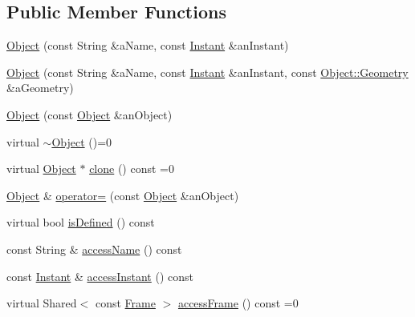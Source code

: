 \subsection*{Public Member Functions}
\begin{DoxyCompactItemize}
\item 
\hyperlink{classostk_1_1physics_1_1env_1_1_object_acd023212c67c893a753f1f3e2cf5c745}{Object} (const String \&a\+Name, const \hyperlink{classostk_1_1physics_1_1time_1_1_instant}{Instant} \&an\+Instant)
\item 
\hyperlink{classostk_1_1physics_1_1env_1_1_object_a8b314016640cee6729de6ae6364ba51f}{Object} (const String \&a\+Name, const \hyperlink{classostk_1_1physics_1_1time_1_1_instant}{Instant} \&an\+Instant, const \hyperlink{classostk_1_1physics_1_1env_1_1_object_a66e44a65aefb23a184a6de531e96935d}{Object\+::\+Geometry} \&a\+Geometry)
\item 
\hyperlink{classostk_1_1physics_1_1env_1_1_object_abddb73324d38f53b395ebee283e78ce1}{Object} (const \hyperlink{classostk_1_1physics_1_1env_1_1_object}{Object} \&an\+Object)
\item 
virtual \hyperlink{classostk_1_1physics_1_1env_1_1_object_a317cd99f9e64b168ca28a7e1dbcf1cbc}{$\sim$\+Object} ()=0
\item 
virtual \hyperlink{classostk_1_1physics_1_1env_1_1_object}{Object} $\ast$ \hyperlink{classostk_1_1physics_1_1env_1_1_object_a8e45ece3cf6d7be05a984a8857b7ecd3}{clone} () const =0
\item 
\hyperlink{classostk_1_1physics_1_1env_1_1_object}{Object} \& \hyperlink{classostk_1_1physics_1_1env_1_1_object_aebe1f6eca2d149968f496577fd291296}{operator=} (const \hyperlink{classostk_1_1physics_1_1env_1_1_object}{Object} \&an\+Object)
\item 
virtual bool \hyperlink{classostk_1_1physics_1_1env_1_1_object_aaa5131bafbaf86fde7f649e88343a901}{is\+Defined} () const
\item 
const String \& \hyperlink{classostk_1_1physics_1_1env_1_1_object_aea899eb9d809f8b344127ceb5c1056c4}{access\+Name} () const
\item 
const \hyperlink{classostk_1_1physics_1_1time_1_1_instant}{Instant} \& \hyperlink{classostk_1_1physics_1_1env_1_1_object_ae0a8b4a06e5dce1c295911f0f81f0ac0}{access\+Instant} () const
\item 
virtual Shared$<$ const \hyperlink{classostk_1_1physics_1_1coord_1_1_frame}{Frame} $>$ \hyperlink{classostk_1_1physics_1_1env_1_1_object_aca93358323c3eb3e4dabf07c33187f14}{access\+Frame} () const =0
\item 

\end{DoxyCompactItemize}
